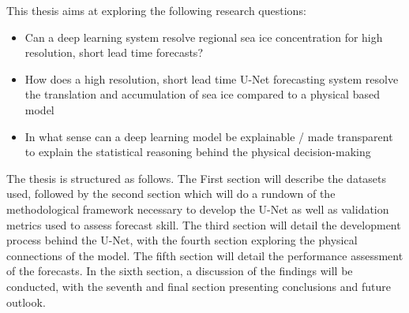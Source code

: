 \documentclass[../main/thesis.tex]{subfiles}
\begin{document}
This thesis aims at exploring the following research questions: 
\begin{itemize}
    \item Can a deep learning system resolve regional sea ice concentration for high resolution, short lead time forecasts? 
    \item How does a high resolution, short lead time U-Net forecasting system resolve the translation and accumulation of sea ice compared to a physical based model
    \item  In what sense can a deep learning model be explainable / made transparent to explain the statistical reasoning behind the physical decision-making
\end{itemize}

The thesis is structured as follows. The First section will describe the datasets used, followed by the second section which will do a rundown of the methodological framework necessary to develop the U-Net as well as validation metrics used to assess forecast skill. The third section will detail the development process behind the U-Net, with the fourth section exploring the physical connections of the model. The fifth section will detail the performance assessment of the forecasts. In the sixth section, a discussion of the findings will be conducted, with the seventh and final section presenting conclusions and future outlook.

\biblio
\end{document}
